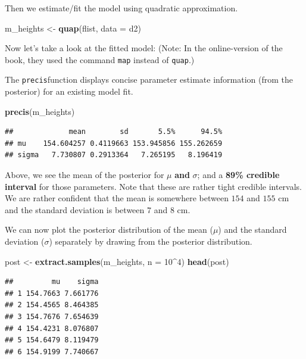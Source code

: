 \documentclass[
]{book}
\newenvironment{Shaded}{\begin{snugshade}}{\end{snugshade}}
\newcommand{\AttributeTok}[1]{\textcolor[rgb]{0.13,0.29,0.53}{#1}}
\newcommand{\DecValTok}[1]{\textcolor[rgb]{0.00,0.00,0.81}{#1}}
\newcommand{\FunctionTok}[1]{\textcolor[rgb]{0.13,0.29,0.53}{\textbf{#1}}}
\newcommand{\NormalTok}[1]{#1}
\newcommand{\OtherTok}[1]{\textcolor[rgb]{0.56,0.35,0.01}{#1}}
\newcommand{\SpecialCharTok}[1]{\textcolor[rgb]{0.81,0.36,0.00}{\textbf{#1}}}
\begin{document}
Then we estimate/fit the model using quadratic approximation.

\begin{Shaded}
\begin{Highlighting}[]
\NormalTok{m\_heights }\OtherTok{\textless{}{-}} \FunctionTok{quap}\NormalTok{(flist, }\AttributeTok{data =}\NormalTok{ d2)}
\end{Highlighting}
\end{Shaded}

Now let's take a look at the fitted model:
(Note: In the online-version of the book, they used the command \texttt{map} instead of \texttt{quap}.)

The \texttt{precis}function displays concise parameter estimate information
(from the posterior) for an existing model fit.

\begin{Shaded}
\begin{Highlighting}[]
\FunctionTok{precis}\NormalTok{(m\_heights)}
\end{Highlighting}
\end{Shaded}

\begin{verbatim}
##             mean        sd       5.5%      94.5%
## mu    154.604257 0.4119663 153.945856 155.262659
## sigma   7.730807 0.2913364   7.265195   8.196419
\end{verbatim}

Above, we see the mean of the posterior for \(\mu\) \textbf{and} \(\sigma\);
and a \textbf{89\% credible interval} for those parameters.
Note that these are rather tight credible intervals. We are rather confident that the mean is somewhere between
\(154\) and \(155\) cm and the standard deviation is between \(7\) and \(8\) cm.

We can now plot the posterior distribution of the mean (\(\mu\)) and the standard
deviation (\(\sigma\)) separately by drawing from the posterior distribution.

\begin{Shaded}
\begin{Highlighting}[]
\NormalTok{post }\OtherTok{\textless{}{-}} \FunctionTok{extract.samples}\NormalTok{(m\_heights, }\AttributeTok{n =} \DecValTok{10}\SpecialCharTok{\^{}}\DecValTok{4}\NormalTok{)}
\FunctionTok{head}\NormalTok{(post)}
\end{Highlighting}
\end{Shaded}

\begin{verbatim}
##         mu    sigma
## 1 154.7663 7.661776
## 2 154.4565 8.464385
## 3 154.7676 7.654639
## 4 154.4231 8.076807
## 5 154.6479 8.119479
## 6 154.9199 7.740667
\end{verbatim}
\end{document}
